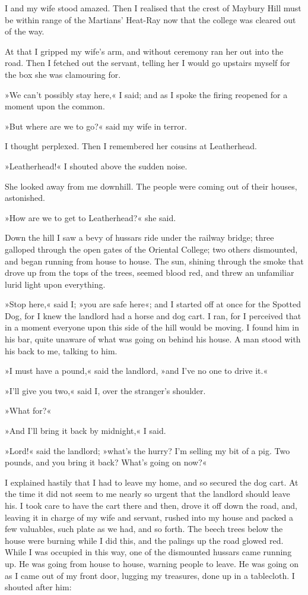 I and my wife stood amazed. Then I realised that the crest of Maybury Hill must be within range of the Martians' Heat-Ray now that the college was cleared out of the way.

At that I gripped my wife's arm, and without ceremony ran her out into the road. Then I fetched out the servant, telling her I would go upstairs myself for the box she was clamouring for.

»We can't possibly stay here,« I said; and as I spoke the firing reopened for a moment upon the common.

»But where are we to go?« said my wife in terror.

I thought perplexed. Then I remembered her cousins at Leatherhead.

»Leatherhead!« I shouted above the sudden noise.

She looked away from me downhill. The people were coming out of their houses, astonished.

»How are we to get to Leatherhead?« she said.

Down the hill I saw a bevy of hussars ride under the railway bridge; three galloped through the open gates of the Oriental College; two others dismounted, and began running from house to house. The sun, shining through the smoke that drove up from the tops of the trees, seemed blood red, and threw an unfamiliar lurid light upon everything.

»Stop here,« said I; »you are safe here«; and I started off at once for the Spotted Dog, for I knew the landlord had a horse and dog cart. I ran, for I perceived that in a moment everyone upon this side of the hill would be moving. I found him in his bar, quite unaware of what was going on behind his house. A man stood with his back to me, talking to him.

»I must have a pound,« said the landlord, »and I've no one to drive it.«

»I'll give you two,« said I, over the stranger's shoulder.

»What for?«

»And I'll bring it back by midnight,« I said.

»Lord!« said the landlord; »what's the hurry? I'm selling my bit of a pig. Two pounds, and you bring it back? What's going on now?«

I explained hastily that I had to leave my home, and so secured the dog cart. At the time it did not seem to me nearly so urgent that the landlord should leave his. I took care to have the cart there and then, drove it off down the road, and, leaving it in charge of my wife and servant, rushed into my house and packed a few valuables, such plate as we had, and so forth. The beech trees below the house were burning while I did this, and the palings up the road glowed red. While I was occupied in this way, one of the dismounted hussars came running up. He was going from house to house, warning people to leave. He was going on as I came out of my front door, lugging my treasures, done up in a tablecloth. I shouted after him:

